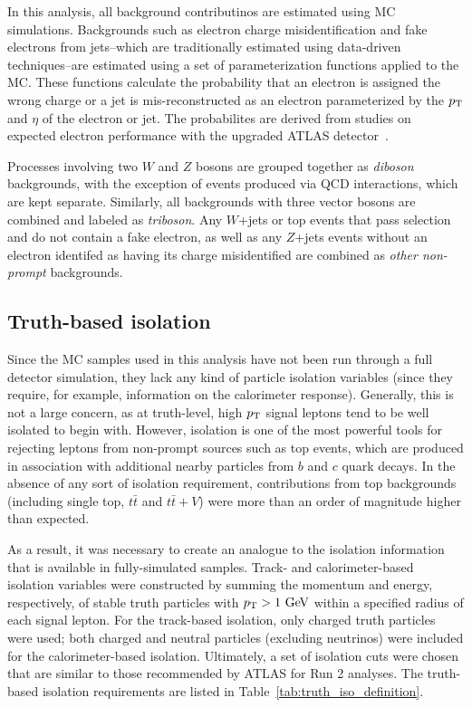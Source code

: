 In this analysis, all background contributinos are estimated using MC simulations.
Backgrounds such as electron charge misidentification and fake electrons from jets--which are traditionally estimated using data-driven techniques--are estimated using a set of parameterization functions applied to the MC.
These functions calculate the probability that an electron is assigned the wrong charge or a jet is mis-reconstructed as an electron parameterized by the $p_{\mathrm{T}}$ and $\eta$ of the electron or jet.
The probabilites are derived from studies on expected electron performance with the upgraded ATLAS detector~\cite{2016.upgrade-electron-performance}.

Processes involving two $W$ and $Z$ bosons are grouped together as \emph{diboson} backgrounds, with the exception of \ssww events produced via QCD interactions, which are kept separate.
Similarly, all backgrounds with three vector bosons are combined and labeled as \emph{triboson}.
Any $W$+jets or top events that pass selection and do not contain a fake electron, as well as any $Z$+jets events without an electron identifed as having its charge misidentified are combined as \emph{other non-prompt} backgrounds.

\subsection{Truth-based isolation}\label{sswwupgrade:isolation}
Since the MC samples used in this analysis have not been run through a full detector simulation, they lack any kind of particle isolation variables (since they require, for example, information on the calorimeter response).
Generally, this is not a large concern, as at truth-level, high $p_{\mathrm{T}}$ signal leptons tend to be well isolated to begin with.
However, isolation is one of the most powerful tools for rejecting leptons from non-prompt sources such as top events, which are produced in association with additional nearby particles from $b$ and $c$ quark decays.
In the absence of any sort of isolation requirement, contributions from top backgrounds (including single top, $t\bar{t}$ and $t\bar{t}+V$) were more than an order of magnitude higher than expected.

As a result, it was necessary to create an analogue to the isolation information that is available in fully-simulated samples.
Track- and calorimeter-based isolation variables were constructed by summing the momentum and energy, respectively, of stable truth particles with $\pt > 1\gev$ within a specified radius of each signal lepton.
For the track-based isolation, only charged truth particles were used; both charged and neutral particles (excluding neutrinos) were included for the calorimeter-based isolation.
Ultimately, a set of isolation cuts were chosen that are similar to those recommended by ATLAS for Run 2 analyses.
The truth-based isolation requirements are listed in Table~\ref{tab:truth_iso_definition}.

